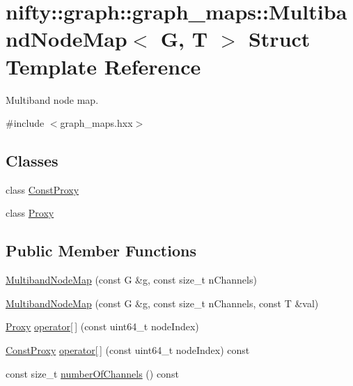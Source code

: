 \hypertarget{structnifty_1_1graph_1_1graph__maps_1_1MultibandNodeMap}{}\section{nifty\+:\+:graph\+:\+:graph\+\_\+maps\+:\+:Multiband\+Node\+Map$<$ G, T $>$ Struct Template Reference}
\label{structnifty_1_1graph_1_1graph__maps_1_1MultibandNodeMap}


Multiband node map.  




{\ttfamily \#include $<$graph\+\_\+maps.\+hxx$>$}

\subsection*{Classes}
\begin{DoxyCompactItemize}
\item 
class \hyperlink{classnifty_1_1graph_1_1graph__maps_1_1MultibandNodeMap_1_1ConstProxy}{Const\+Proxy}
\item 
class \hyperlink{classnifty_1_1graph_1_1graph__maps_1_1MultibandNodeMap_1_1Proxy}{Proxy}
\end{DoxyCompactItemize}
\subsection*{Public Member Functions}
\begin{DoxyCompactItemize}
\item 
\hyperlink{structnifty_1_1graph_1_1graph__maps_1_1MultibandNodeMap_ab532c7c22bab384004e75c21960f070f}{Multiband\+Node\+Map} (const G \&g, const size\+\_\+t n\+Channels)
\item 
\hyperlink{structnifty_1_1graph_1_1graph__maps_1_1MultibandNodeMap_ac5f3573ff6b06c219074426c2a66e0ef}{Multiband\+Node\+Map} (const G \&g, const size\+\_\+t n\+Channels, const T \&val)
\item 
\hyperlink{classnifty_1_1graph_1_1graph__maps_1_1MultibandNodeMap_1_1Proxy}{Proxy} \hyperlink{structnifty_1_1graph_1_1graph__maps_1_1MultibandNodeMap_a568a4290cfbdbf50e9c62e5f64d21a2a}{operator\mbox{[}$\,$\mbox{]}} (const uint64\+\_\+t node\+Index)
\item 
\hyperlink{classnifty_1_1graph_1_1graph__maps_1_1MultibandNodeMap_1_1ConstProxy}{Const\+Proxy} \hyperlink{structnifty_1_1graph_1_1graph__maps_1_1MultibandNodeMap_a11310bdd64c8b9ee5ceeb405ea206cf6}{operator\mbox{[}$\,$\mbox{]}} (const uint64\+\_\+t node\+Index) const 
\item 
const size\+\_\+t \hyperlink{structnifty_1_1graph_1_1graph__maps_1_1MultibandNodeMap_ae06b7340608e8dd01c16d69716fd963e}{number\+Of\+Channels} () const 
\end{DoxyCompactItemize}


